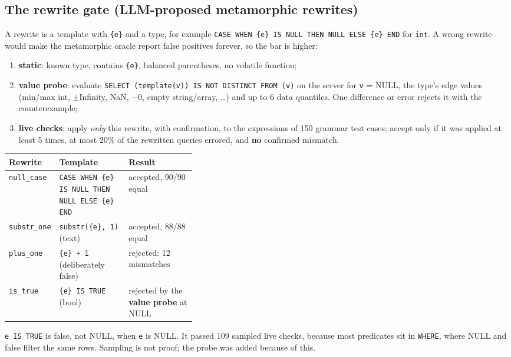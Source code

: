 \subsection{The rewrite gate (LLM-proposed metamorphic rewrites)}
\label{sec:rwgate}

A rewrite is a template with \texttt{\{e\}} and a type, for example
\texttt{CASE WHEN \{e\} IS NULL THEN NULL ELSE \{e\} END} for \texttt{int}.
A wrong rewrite would make the metamorphic oracle report false positives
forever, so the bar is higher:
\begin{enumerate}
  \item \textbf{static}: known type, contains \texttt{\{e\}}, balanced
    parentheses, no volatile function;
  \item \textbf{value probe}: evaluate
    \texttt{SELECT (template(v)) IS NOT DISTINCT FROM (v)} on the server for
    \texttt{v} = NULL, the type's edge values (min/max int, $\pm$Infinity,
    NaN, $-0$, empty string/array, \dots) and up to 6 data quantiles. One
    difference or error rejects it with the counterexample;
  \item \textbf{live checks}: apply \emph{only} this rewrite, with
    confirmation, to the expressions of 150 grammar test cases; accept only if
    it was applied at least 5 times, at most 20\% of the rewritten queries
    errored, and \textbf{no} confirmed mismatch.
\end{enumerate}

\begin{keybox}
\begin{tabular}{lp{0.37\linewidth}l}
\toprule
Rewrite & Template & Result \\
\midrule
\texttt{null\_case} & \texttt{CASE WHEN \{e\} IS NULL THEN NULL ELSE \{e\} END} & accepted, 90/90 equal \\
\texttt{substr\_one} & \texttt{substr(\{e\}, 1)} (text) & accepted, 88/88 equal \\
\texttt{plus\_one} & \texttt{\{e\} + 1} (deliberately false) & rejected: 12 mismatches \\
\texttt{is\_true} & \texttt{\{e\} IS TRUE} (bool) & rejected by the \textbf{value probe} at NULL \\
\bottomrule
\end{tabular}

\texttt{e IS TRUE} is false, not NULL, when \texttt{e} is NULL. It passed 109
sampled live checks, because most predicates sit in \texttt{WHERE}, where NULL
and false filter the same rows. Sampling is not proof; the probe was added
because of this.
\end{keybox}

